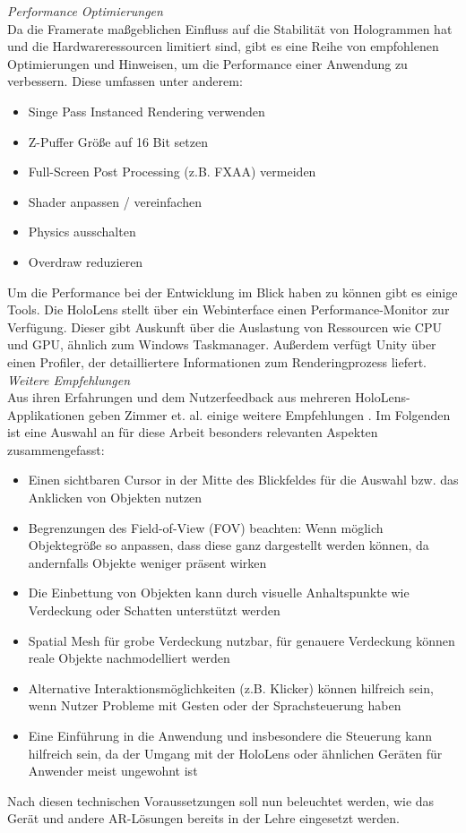 \textit{Performance Optimierungen}\\
Da die Framerate maßgeblichen Einfluss auf die Stabilität von Hologrammen hat und die Hardwareressourcen limitiert sind, gibt es eine Reihe von empfohlenen Optimierungen und Hinweisen, um die Performance einer Anwendung zu verbessern. Diese umfassen unter anderem:
\begin{itemize}[topsep=-2px]
	\setlength{\itemsep}{-1pt}
	\singlespacing
	\item Singe Pass Instanced Rendering verwenden
	\item Z-Puffer Größe auf 16 Bit setzen
	\item Full-Screen Post Processing (z.B. FXAA) vermeiden
	\item Shader anpassen / vereinfachen
	\item Physics ausschalten
	\item Overdraw reduzieren
\end{itemize}
\vspace{6px}

Um die Performance bei der Entwicklung im Blick haben zu können gibt es einige Tools. Die HoloLens stellt über ein Webinterface einen Performance-Monitor zur Verfügung. Dieser gibt Auskunft über die Auslastung von Ressourcen wie CPU und GPU, ähnlich zum Windows Taskmanager. Außerdem verfügt Unity über einen Profiler, der detailliertere Informationen zum Renderingprozess liefert.\\

\textit{Weitere Empfehlungen}\\
Aus ihren Erfahrungen und dem Nutzerfeedback aus mehreren HoloLens-Applikationen geben Zimmer et. al. einige weitere Empfehlungen \cite{Zimmer17}. Im Folgenden ist eine Auswahl an für diese Arbeit besonders relevanten Aspekten zusammengefasst:
\begin{itemize}[topsep=-2px]
	\setlength{\itemsep}{-1pt}
	\singlespacing
	\item Einen sichtbaren Cursor in der Mitte des Blickfeldes für die Auswahl bzw. das Anklicken von Objekten nutzen
	\item Begrenzungen des Field-of-View (FOV) beachten: Wenn möglich Objektegröße so anpassen, dass diese ganz dargestellt werden können, da andernfalls Objekte weniger präsent wirken
	\item Die Einbettung von Objekten kann durch visuelle Anhaltspunkte wie Verdeckung oder Schatten unterstützt werden
	\item Spatial Mesh für grobe Verdeckung nutzbar, für genauere Verdeckung können reale Objekte nachmodelliert werden 
	\item Alternative Interaktionsmöglichkeiten (z.B. Klicker) können hilfreich sein, wenn Nutzer Probleme mit Gesten oder der Sprachsteuerung haben
	\item Eine Einführung in die Anwendung und insbesondere die Steuerung kann hilfreich sein, da der Umgang mit der HoloLens oder ähnlichen Geräten für Anwender meist ungewohnt ist
\end{itemize}
\vspace{6px}

Nach diesen technischen Voraussetzungen soll nun beleuchtet werden, wie das Gerät und andere AR-Lösungen bereits in der Lehre eingesetzt werden.

